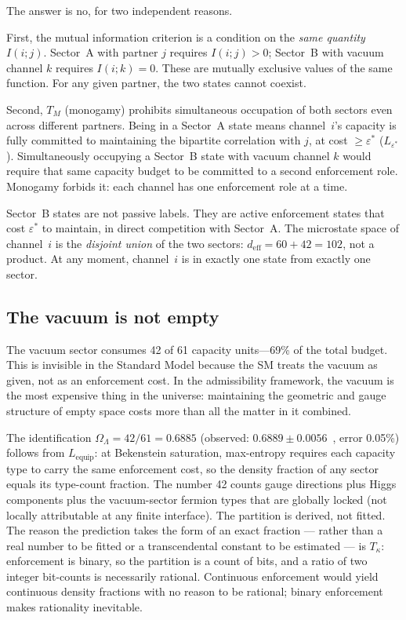 \documentclass[11pt]{article}
\begin{document}
The answer is no, for two independent reasons.

First, the mutual information criterion is a condition on the \emph{same quantity} $I(i;j)$.  Sector~A with partner $j$ requires $I(i;j) > 0$; Sector~B with vacuum channel $k$ requires $I(i;k) = 0$.  These are mutually exclusive values of the same function.  For any given partner, the two states cannot coexist.

Second, $T_M$ (monogamy) prohibits simultaneous occupation of both sectors even across different partners.  Being in a Sector~A state means channel~$i$'s capacity is fully committed to maintaining the bipartite correlation with $j$, at cost $\ge \varepsilon^*$ ($L_{\varepsilon^*}$).  Simultaneously occupying a Sector~B state with vacuum channel $k$ would require that same capacity budget to be committed to a second enforcement role.  Monogamy forbids it: each channel has one enforcement role at a time.

Sector~B states are not passive labels.  They are active enforcement states that cost $\varepsilon^*$ to maintain, in direct competition with Sector~A.  The microstate space of channel~$i$ is the \emph{disjoint union} of the two sectors: $d_{\mathrm{eff}} = 60 + 42 = 102$, not a product.  At any moment, channel~$i$ is in exactly one state from exactly one sector.


\subsection{The vacuum is not empty}

The vacuum sector consumes 42 of 61 capacity units---69\% of the total budget.  This is invisible in the Standard Model because the SM treats the vacuum as given, not as an enforcement cost.  In the admissibility framework, the vacuum is the most expensive thing in the universe: maintaining the geometric and gauge structure of empty space costs more than all the matter in it combined.

The identification $\Omega_\Lambda = 42/61 = 0.6885$ (observed: $0.6889 \pm 0.0056$~\cite{Planck2020}, error 0.05\%) follows from $L_{\mathrm{equip}}$: at Bekenstein saturation, max-entropy requires each capacity type to carry the same enforcement cost, so the density fraction of any sector equals its type-count fraction.  The number 42 counts gauge directions plus Higgs components plus the vacuum-sector fermion types that are globally locked (not locally attributable at any finite interface).  The partition is derived, not fitted.  The reason the prediction takes the form of an exact fraction --- rather than a real number to be fitted or a transcendental constant to be estimated --- is $T_\kappa$: enforcement is binary, so the partition is a count of bits, and a ratio of two integer bit-counts is necessarily rational.  Continuous enforcement would yield continuous density fractions with no reason to be rational; binary enforcement makes rationality inevitable.
\end{document}
